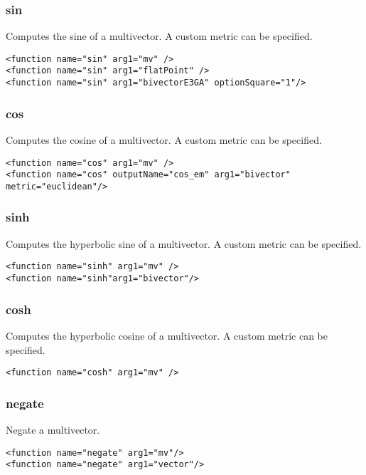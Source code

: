 \documentclass[10pt, a4paper]{article}
\begin{document}
\subsubsection*{sin}

Computes the sine of a multivector.
A custom metric can be specified.
\begin{verbatim}
<function name="sin" arg1="mv" />
<function name="sin" arg1="flatPoint" />
<function name="sin" arg1="bivectorE3GA" optionSquare="1"/>
\end{verbatim}

\subsubsection*{cos}

Computes the cosine of a multivector.
A custom metric can be specified.
\begin{verbatim}
<function name="cos" arg1="mv" />
<function name="cos" outputName="cos_em" arg1="bivector" metric="euclidean"/>
\end{verbatim}

\subsubsection*{sinh}

Computes the hyperbolic sine of a multivector.
A custom metric can be specified.
\begin{verbatim}
<function name="sinh" arg1="mv" />
<function name="sinh"arg1="bivector"/>
\end{verbatim}

\subsubsection*{cosh}

Computes the hyperbolic cosine of a multivector.
A custom metric can be specified.
\begin{verbatim}
<function name="cosh" arg1="mv" />
\end{verbatim}

\subsubsection*{negate}

Negate a multivector.
\begin{verbatim}
<function name="negate" arg1="mv"/>
<function name="negate" arg1="vector"/>
\end{verbatim}
\end{document}
